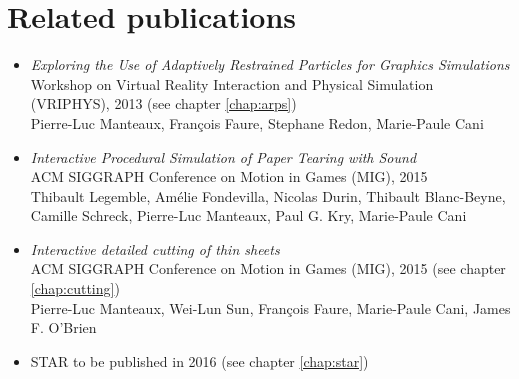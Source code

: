 \section{Related publications}
\begin{itemize}
    \item \cite{Manteaux2013} \emph{Exploring the Use of Adaptively Restrained Particles for Graphics Simulations} \\
    Workshop on Virtual Reality Interaction and Physical Simulation (VRIPHYS), 2013 (see chapter \ref{chap:arps})\\
    Pierre-Luc Manteaux, François Faure, Stephane Redon, Marie-Paule Cani
    \item \cite{Lejemble2015} \emph{Interactive Procedural Simulation of Paper Tearing with Sound} \\
    ACM SIGGRAPH Conference on Motion in Games (MIG), 2015 \\
    Thibault Legemble, Amélie Fondevilla, Nicolas Durin, Thibault Blanc-Beyne, Camille Schreck, Pierre-Luc Manteaux, Paul G. Kry, Marie-Paule Cani
    \item \cite{Manteaux2015} \emph{Interactive detailed cutting of thin sheets} \\
        ACM SIGGRAPH Conference on Motion in Games (MIG), 2015 (see chapter \ref{chap:cutting})\\
        Pierre-Luc Manteaux, Wei-Lun Sun, François Faure, Marie-Paule Cani, James F. O'Brien
	\item STAR to be published in 2016 (see chapter \ref{chap:star})
\end{itemize}
